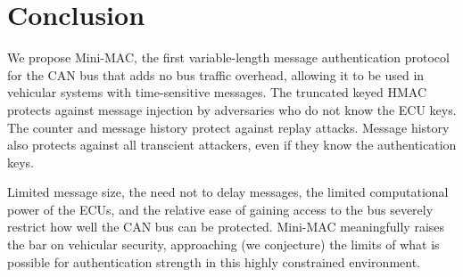 \section{Conclusion}
\label{conclude}

We propose Mini-MAC, the first variable-length message authentication
protocol for the CAN bus that adds no bus traffic overhead, 
allowing it to be used in vehicular systems with time-sensitive messages.  The truncated keyed HMAC protects against
message injection by adversaries who do not know the ECU keys.  The counter and message history protect
against replay attacks.  
Message history also protects against all transcient attackers, even if they know the authentication keys.

Limited message size, the need not to delay messages, the limited computational power of the ECUs,
and the relative ease of gaining access to the bus 
severely restrict how well the CAN bus can be protected.  Mini-MAC meaningfully raises the bar on vehicular security,
approaching (we conjecture) the limits of what is possible for authentication strength in this highly
constrained environment.

